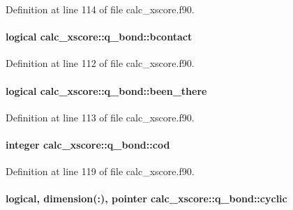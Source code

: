 Definition at line 114 of file calc\-\_\-xscore.\-f90.

\hypertarget{structcalc__xscore_1_1q__bond_aa775de69c3aa30919bc59767dadd7684}{
\paragraph[{bcontact}]{\setlength{\rightskip}{0pt plus 5cm}logical calc\-\_\-xscore\-::q\-\_\-bond\-::bcontact}}\label{structcalc__xscore_1_1q__bond_aa775de69c3aa30919bc59767dadd7684}


Definition at line 112 of file calc\-\_\-xscore.\-f90.

\hypertarget{structcalc__xscore_1_1q__bond_a5bbf0925ba0bdb3c022eba0137249fbc}{
\paragraph[{been\-\_\-there}]{\setlength{\rightskip}{0pt plus 5cm}logical calc\-\_\-xscore\-::q\-\_\-bond\-::been\-\_\-there}}\label{structcalc__xscore_1_1q__bond_a5bbf0925ba0bdb3c022eba0137249fbc}


Definition at line 113 of file calc\-\_\-xscore.\-f90.

\hypertarget{structcalc__xscore_1_1q__bond_a17d0ee1552e7c2622db67d03d557c04d}{
\paragraph[{cod}]{\setlength{\rightskip}{0pt plus 5cm}integer calc\-\_\-xscore\-::q\-\_\-bond\-::cod}}\label{structcalc__xscore_1_1q__bond_a17d0ee1552e7c2622db67d03d557c04d}


Definition at line 119 of file calc\-\_\-xscore.\-f90.

\hypertarget{structcalc__xscore_1_1q__bond_a2e7f9a72e5be34f8c84a34ef289ca481}{
\paragraph[{cyclic}]{\setlength{\rightskip}{0pt plus 5cm}logical, dimension(\-:), pointer calc\-\_\-xscore\-::q\-\_\-bond\-::cyclic}}\label{structcalc__xscore_1_1q__bond_a2e7f9a72e5be34f8c84a34ef289ca481}


